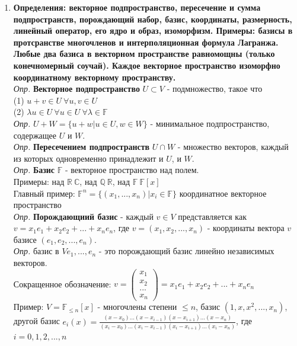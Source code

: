 \documentclass[12pt, oneside]{book}
\theoremstyle{definition}
\renewcommand{\leq}{\leqslant}
\begin{document}
\begin{enumerate}
\item \textbf{Определения: векторное подпространство, пересечение и сумма подпространств, порождающий набор, базис, координаты, размерность, линейный оператор, его ядро и образ, изоморфизм. Примеры: базисы в протсранстве многочленов и интерполяционная формула Лагранжа. Любые два базиса в векторном пространстве равномощны (только конечномерный соучай). Каждое векторное пространство изоморфно координатному векторному пространству.}\\
\textit{Опр.} \textbf{Векторное подпространство} $U \subset V$ - подмножество, такое что \\
(1) $u + v \in U \ \forall u, v \in U$\\
(2) $\lambda u \in U \ \forall u \in U \ \forall \lambda \in \mathbb{F}$\\
\textit{Опр.} $U + W = \{ u + w | u \in U, w \in W \}$ - минимальное подпространство, содержащее $U$ и $W$. \\
\textit{Опр.} \textbf{Пересечением подпространств} $U \cap W$ - множество векторов, каждый из которых одновременно принадлежит и $U$, и $W$.\\
\textit{Опр.} \textbf{Базис} $\mathbb{F}$ - векторное пространство над полем. \\
Примеры: над $\mathbb{R} \ \mathbb{C}$, над $\mathbb{Q} \ \mathbb{R}$, над $\mathbb{F} \ \mathbb{F}[x]$\\
Главный пример: $\mathbb{F}^n = \{ (x_1, ... , x_n) | x_i \in \mathbb{F}\}$ координатное векторное пространство \\
\textit{Опр.} \textbf{Порождающиий базис} - каждый $v \in V$ представляется как $v = x_1 e_1 + x_2 e_2 + ... + x_n e_n$, где $v = (x_1, x_2, ... , x_n)$ - координаты вектора $v$ базисе $(e_1, e_2, ... , e_n).$\\
\textit{Опр.} базис в $V e_1, ... , e_n$ - это порождающий базис линейно независимых векторов.\\ 
Сокращенное обозначение: 
$v = 
\begin{pmatrix}
    x_1 \\
    x_2 \\
    ... \\
    x_n
\end{pmatrix} = x_1 e_1 + x_2 e_2 + ... + x_n e_n$\\
Пример: $V = \mathbb{F}_{\leq n} [x]$ - многочлены степени $\leq n$, базис $(1, x, x^2, ... , x_n)$, другой базис $e_i (x) = \frac{(x - x_0)...(x - x_{i - 1})(x - x_{i+1})...(x - x_n)}{(x_i - x_0)...(x_i - x_{i - 1})(x_i - x_{i + 1})...(x_i - x_n)}$, где $i = 0, 1, 2, ... , n$\\

\end{enumerate}
\end{document}
